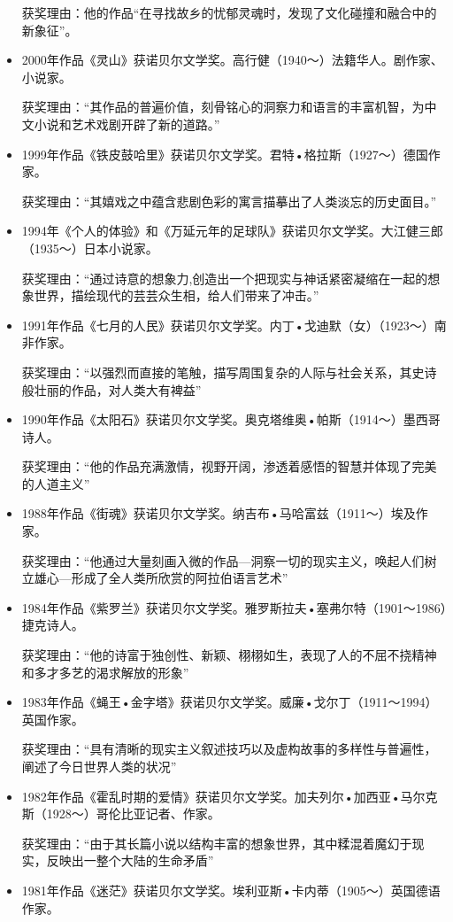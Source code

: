 \documentclass[UTF8,a4paper,8pt]{ctexbook}
\begin{document}
\begin{itemize}
			获奖理由：他的作品“在寻找故乡的忧郁灵魂时，发现了文化碰撞和融合中的新象征”。
			\item 2000年作品《灵山》获诺贝尔文学奖。高行健（1940～）法籍华人。剧作家、小说家。
			
			获奖理由：“其作品的普遍价值，刻骨铭心的洞察力和语言的丰富机智，为中文小说和艺术戏剧开辟了新的道路。”
			\item 1999年作品《铁皮鼓哈里》获诺贝尔文学奖。君特•格拉斯（1927～）德国作家。
			
			获奖理由：“其嬉戏之中蕴含悲剧色彩的寓言描摹出了人类淡忘的历史面目。”
			
			\item 1994年《个人的体验》和《万延元年的足球队》获诺贝尔文学奖。大江健三郎（1935～）日本小说家。
			
			获奖理由：“通过诗意的想象力,创造出一个把现实与神话紧密凝缩在一起的想象世界，描绘现代的芸芸众生相，给人们带来了冲击。”
			\item 1991年作品《七月的人民》获诺贝尔文学奖。内丁•戈迪默（女）（1923～）南非作家。
			
			获奖理由：“以强烈而直接的笔触，描写周围复杂的人际与社会关系，其史诗般壮丽的作品，对人类大有裨益”
			\item 1990年作品《太阳石》获诺贝尔文学奖。奥克塔维奥•帕斯（1914～）墨西哥诗人。
			
			获奖理由：“他的作品充满激情，视野开阔，渗透着感悟的智慧并体现了完美的人道主义”
			\item 1988年作品《街魂》获诺贝尔文学奖。纳吉布•马哈富兹（1911～）埃及作家。
			
			获奖理由：“他通过大量刻画入微的作品—洞察一切的现实主义，唤起人们树立雄心—形成了全人类所欣赏的阿拉伯语言艺术”
			\item 1984年作品《紫罗兰》获诺贝尔文学奖。雅罗斯拉夫•塞弗尔特（1901～1986）捷克诗人。
			
			获奖理由：“他的诗富于独创性、新颖、栩栩如生，表现了人的不屈不挠精神和多才多艺的渴求解放的形象”
			\item 1983年作品《蝇王•金字塔》获诺贝尔文学奖。威廉•戈尔丁（1911～1994）英国作家。
			
			获奖理由：“具有清晰的现实主义叙述技巧以及虚构故事的多样性与普遍性，阐述了今日世界人类的状况”
			\item 1982年作品《霍乱时期的爱情》获诺贝尔文学奖。加夫列尔•加西亚•马尔克斯（1928～）哥伦比亚记者、作家。
			
			获奖理由：“由于其长篇小说以结构丰富的想象世界，其中糅混着魔幻于现实，反映出一整个大陆的生命矛盾”
			\item 1981年作品《迷茫》获诺贝尔文学奖。埃利亚斯•卡内蒂（1905～）英国德语作家。
			

\end{itemize}
\end{document}
